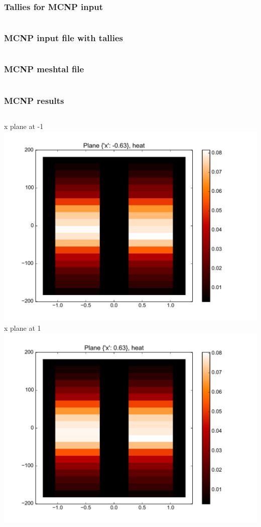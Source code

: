 \begin{frame}[fragile]
    \frametitle{Tallies for MCNP input}
    \inputminted[frame=single,fontfamily=tt,fontsize=\tiny]{python}{examples/hmcnp5.py}
\end{frame}

\begin{frame}[fragile]
    \frametitle{MCNP input file with tallies}
    \inputminted[frame=single,fontfamily=tt,fontsize=\tiny,firstline=130]{rst}{examples/m5_0/i_}
\end{frame}

\begin{frame}[fragile]
    \frametitle{MCNP meshtal file}
    \inputminted[frame=single,fontfamily=tt,fontsize=\tiny,firstline=30,lastline=60]{rst}{examples/m5_0/meshtal}
\end{frame}

\begin{frame}[fragile]
    \frametitle{MCNP results}
    \begin{columns}
        {\tiny x plane at -1}
        \includegraphics[width=\textwidth]{examples/hmcnp5_hx1.pdf}
        {\tiny x plane at 1}
        \includegraphics[width=\textwidth]{examples/hmcnp5_hx2.pdf}
    \end{columns}
\end{frame}


